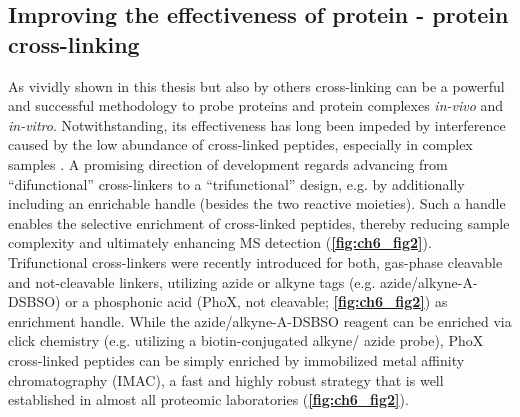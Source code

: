 \subsection*{Improving the effectiveness of protein - protein cross-linking}
As vividly shown in this thesis but also by others \cite{RN11, RN9, RN10} cross-linking can be a powerful and successful methodology to probe proteins and protein complexes \emph{in-vivo} and \emph{in-vitro}. Notwithstanding, its effectiveness has long been impeded by interference caused by the low abundance of cross-linked peptides, especially in complex samples \cite{RN12}. A promising direction of development regards advancing from “difunctional” cross-linkers to a “trifunctional” design, e.g. by additionally including an enrichable handle (besides the two reactive moieties). Such a handle enables the selective enrichment of cross-linked peptides, thereby reducing sample complexity and ultimately enhancing MS detection (\textbf{\autoref{fig:ch6_fig2}}). Trifunctional cross-linkers were recently introduced for both, gas-phase cleavable and not-cleavable linkers, utilizing azide or alkyne tags (e.g. azide/alkyne-A-DSBSO) \cite{RN13} or a phosphonic acid (PhoX, not cleavable; \textbf{\autoref{fig:ch6_fig2}}) \cite{RN14} as enrichment handle. While the azide/alkyne-A-DSBSO reagent can be enriched via click chemistry \cite{RN15} (e.g. utilizing a biotin-conjugated alkyne/ azide probe), PhoX cross-linked peptides can be simply enriched by immobilized metal affinity chromatography (IMAC), a fast and highly robust strategy that is well established in almost all proteomic laboratories (\textbf{\autoref{fig:ch6_fig2}}).
